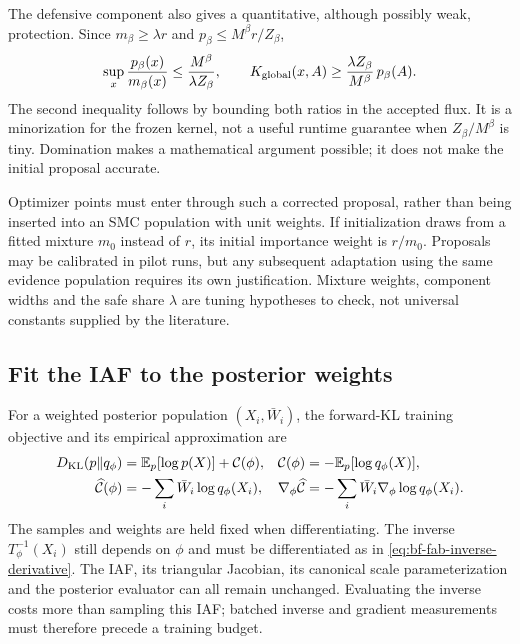 The defensive component also gives a quantitative, although possibly weak,
protection. Since $m_\beta\ge\lambda r$ and
$p_\beta\le M^\beta r/Z_\beta$,
\begin{equation}
 \sup_x\frac{p_\beta(x)}{m_\beta(x)}
 \le\frac{M^\beta}{\lambda Z_\beta},\qquad
 K_{\rm global}(x,A)\ge
 \frac{\lambda Z_\beta}{M^\beta}\,p_\beta(A).
 \label{eq:bf-is-defensive-mh-bound}
\end{equation}
The second inequality follows by bounding both ratios in the accepted flux.
It is a minorization for the frozen kernel, not a useful runtime guarantee
when $Z_\beta/M^\beta$ is tiny. Domination makes a mathematical argument
possible; it does not make the initial proposal accurate.

Optimizer points must enter through such a corrected proposal, rather than
being inserted into an SMC population with unit weights. If initialization
draws from a fitted mixture $m_0$ instead of $r$, its initial importance
weight is $r/m_0$. Proposals may be calibrated in pilot runs, but any subsequent
adaptation using the same evidence population requires its own justification.
Mixture weights, component widths and the safe share $\lambda$ are tuning
hypotheses to check, not universal constants supplied by the literature.

\subsection{Fit the IAF to the posterior weights}

For a weighted posterior population $(X_i,\bar W_i)$, the forward-KL
training objective and its empirical approximation are
\begin{align}
 D_{\rm KL}(p\Vert q_\phi)
   &=\mathbb{E}_p[\log p(X)]+\mathcal C(\phi),
   &\mathcal C(\phi)&=-\mathbb{E}_p[\log q_\phi(X)],\\
 \widehat{\mathcal C}(\phi)
   &=-\sum_i\bar W_i\log q_\phi(X_i),
   &\nabla_\phi\widehat{\mathcal C}
   &=-\sum_i\bar W_i\nabla_\phi\log q_\phi(X_i).
 \label{eq:bf-is-posterior-fkl}
\end{align}
The samples and weights are held fixed when differentiating. The inverse
$T_\phi^{-1}(X_i)$ still depends on $\phi$ and must be differentiated as in
\eqref{eq:bf-fab-inverse-derivative}. The IAF, its triangular Jacobian, its
canonical scale parameterization and the posterior evaluator can all remain
unchanged. Evaluating the inverse costs more than sampling this IAF; batched
inverse and gradient measurements must therefore precede a training budget.

